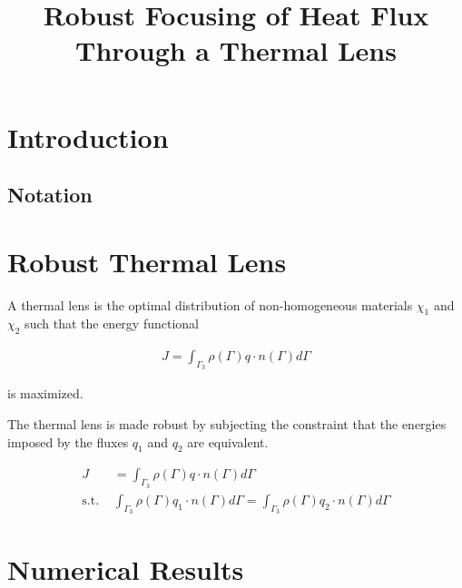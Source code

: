 \documentclass[11pt]{article}
\title{Robust Focusing of Heat Flux\\ Through a Thermal Lens}
\date{}
\begin{document}
\maketitle

\begin{abstract}
    
\end{abstract}

\section{Introduction}

\subsection{Notation}

\section{Robust Thermal Lens}

A thermal lens is the optimal distribution of non-homogeneous materials $\chi_1$ and $\chi_2$ such that the energy functional

\begin{align*}
	J = \int_{\Gamma_3}\rho(\Gamma)q\cdot n(\Gamma)d\Gamma
\end{align*}

is maximized.


The thermal lens is made robust by subjecting the constraint that the energies imposed by the fluxes $q_1$ and $q_2$ are equivalent.

\begin{align*}
	J &= \int_{\Gamma_3}\rho(\Gamma)q\cdot n(\Gamma)d\Gamma \\
	\text{s.t. } & \int_{\Gamma_3}\rho(\Gamma)q_1\cdot n(\Gamma)d\Gamma = \int_{\Gamma_3}\rho(\Gamma)q_2\cdot n(\Gamma)d\Gamma 
\end{align*}


\section{Numerical Results}

\newpage


\end{document}
